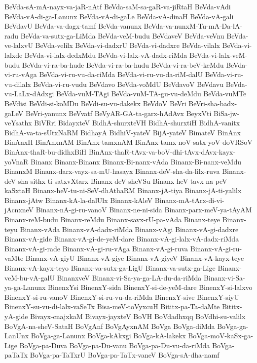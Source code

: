 {BeVda-sA-mA-nayx-va-jaR-nAtf
BeVda-saM-sa-gaR-va-jiRtaH
BeVda-vAdi
BeVda-vA-di-ga-Lanunx
BeVda-vA-di-gaLe
BeVda-vA-dinaH
BeVda-vA-gali
BeVdavU
BeVda-va-dagx-tamf
BeVda-vanunx
BeVda-va-nunxM-Tu-mA-Da-lA-radu
BeVda-va-sutx-ga-LiMda
BeVda-veM-budu
BeVdaveV
BeVda-veVnu
BeVda-ve-lalxvU
BeVda-velilx
BeVda-vi-dadxrU
BeVda-vi-dadxre
BeVda-vilalx
BeVda-vi-lalxde
BeVda-vi-lalx-dedxMdu
BeVda-vi-lalx-vA-dadx-riMda
BeVda-vi-lalx-veM-budu
BeVda-vi-ra-ba-hude
BeVda-vi-ra-ba-hudu
BeVda-vi-ra-beV-keMdu
BeVda-vi-ru-vAga
BeVda-vi-ru-vu-da-riMda
BeVda-vi-ru-vu-da-riM-dalU
BeVda-vi-ru-vu-dilalx
BeVda-vi-ru-vudu
BeVdavo
BeVda-voMdU
BeVdavoV
BeVdavu
BeVda-vu-LaLx-dAdxgi
BeVda-vuM-TAgi
BeVda-vuM-TA-gu-vu-deMdu
BeVda-vuMTe
BeVdisi
BeVdi-si-koMDu
BeVdi-su-vu-dakekx
BeVdoV
BeVri
BeVri-sha-badx-gaLeV
BeVri-yanunx
BeVvatf
BeVyAR-GA-ta-garx-hAdAvx
BeyxVti
BiSa-jw-veYsathx
BiVRri
BidayxteV
BidhA-shurxteVH
BidhA-shurxtiH
BidhA-vanitx
BidhA-va-ta-sUtxNaRM
BidhayA
BidhiV-yateV
BijA-yateV
BimateV
BinAnx
BinAnxH
BinAnxnAM
BinAnx-tamxnAM
BinAnx-tamx-noV-satx-yoV-doVRSoV
BinAnx-thaR-bu-didhxBiH
BinAnx-thaR-tAvx-va-boV-dhi-tAvx-dAvx-kayx-yoVnaR
Binanx
Binanx-Binanx
Binanx-Bi-nanx-vAda
Binanx-Bi-nanx-veMdu
BinanxM
Binanx-darx-vayx-sa-mU-hasayx
Binanx-deV-sha-da-lilx-ruva
Binanx-deV-sha-sithx-ti-satxvXtarx
Binanx-deV-sheVSu
Binanx-heV-tavx-na-peV-kaSxtaH
Binanx-heV-tu-ni-SeV-dhAthaRM
Binanx-jA-tiya
Binanx-jA-ti-yalilx
Binanx-jAtw
Binanx-kA-la-dalUlx
Binanx-kAleV
Binanx-mA-tArx-di-vi-jAcnxneV
Binanx-nA-gi-ru-vanoV
Binanx-ne-ni-sida
Binanx-parx-meV-ya-tAyAM
Binanx-reM-budu
Binanx-reMdu
Binanx-savx-rU-pa-vAda
Binanx-teye
Binanx-teyu
Binanx-vAda
Binanx-vA-dadx-riMda
Binanx-vAgi
Binanx-vA-gi-dadxre
Binanx-vA-gide
Binanx-vA-gi-de-yeM-dare
Binanx-vA-gi-lalx-vA-dadx-riMda
Binanx-vA-gi-rade
Binanx-vA-gi-ru-vAga
Binanx-vA-gi-ruva
Binanx-vA-gi-ru-vaMte
Binanx-vA-giyU
Binanx-vA-giye
Binanx-vA-giyeV
Binanx-vA-kayx-teye
Binanx-vA-kayx-teyo
Binanx-va-sutx-ga-LigU
Binanx-va-sutx-ga-Lige
Binanx-veM-bu-vA-galU
BinanxveV
Binanx-vi-Sa-ya-ga-LA-du-da-riMda
Binanx-vi-Sa-ya-ga-Lanunx
BinenxYsi
BinenxY-sida
BinenxY-si-de-yeM-dare
BinenxY-si-lalxvo
BinenxY-si-ru-vanoV
BinenxY-si-ru-vu-da-riMda
BinenxY-sive
BinenxY-siyU
BinenxY-su-vu-di-lalx-vaSeTx
Bisa-meV-toVyxcuH
Bititx-pa-Ta-daMte
Bititx-yA-gide
Bivayx-cnajxkaM
Bivayx-jayxteV
BoVH
BoVdadhxqq
BoVdhi-su-valilx
BoVgA-na-sheV-SataH
BoVgAnf
BoVgAyxnAM
BoVga
BoVga-diMda
BoVga-ga-LanUnx
BoVga-ga-Lanunx
BoVga-kAkxgi
BoVga-kA-lakekx
BoVga-moV-kaSx-ga-Lige
BoVga-pa-Duva
BoVga-pa-Du-vanu
BoVga-pa-Du-vu-da-riMda
BoVga-paTaTx
BoVga-pa-TaTxrU
BoVga-pa-TaTx-vaneV
BoVga-sA-dha-namf
}
